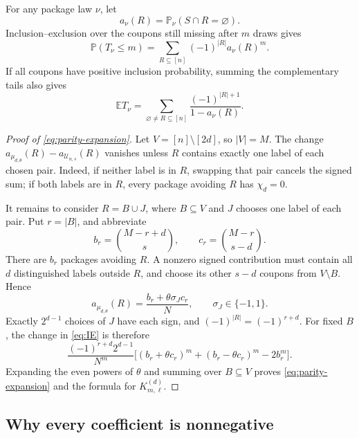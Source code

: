 \documentclass[11pt]{article}
\numberwithin{equation}{section}
\theoremstyle{remark}
\newcommand{\Pp}{\mathbb P}
\newcommand{\E}{\mathbb E}
\newcommand{\1}{\mathbf 1}
\newcommand{\U}{\mathcal U}
\begin{document}
For any package law $\nu$, let
\[
 a_\nu(R)=\Pp_\nu(S\cap R=\varnothing).
\]
Inclusion--exclusion over the coupons still missing after $m$ draws gives
\begin{equation}\label{eq:IE}
 \Pp(T_\nu\leq m)=\sum_{R\subseteq[n]}(-1)^{|R|}a_\nu(R)^m.
\end{equation}
If all coupons have positive inclusion probability, summing the complementary tails also gives
\begin{equation}\label{eq:mean-IE}
 \E T_\nu=\sum_{\varnothing\ne R\subseteq[n]}
       \frac{(-1)^{|R|+1}}{1-a_\nu(R)}.
\end{equation}

\begin{proof}[Proof of \eqref{eq:parity-expansion}]
Let $V=[n]\setminus[2d]$, so $|V|=M$. The change
$a_{\mu_{d,\theta}}(R)-a_{\U_{n,s}}(R)$ vanishes unless $R$ contains exactly one label of each chosen pair. Indeed, if neither label is in $R$, swapping that pair cancels the signed sum; if both labels are in $R$, every package avoiding $R$ has $\chi_d=0$.

It remains to consider $R=B\cup J$, where $B\subseteq V$ and $J$ chooses one label of each pair. Put $r=|B|$, and abbreviate
\[
 b_r=\binom{M-r+d}{s},\qquad c_r=\binom{M-r}{s-d}.
\]
There are $b_r$ packages avoiding $R$. A nonzero signed contribution must contain all $d$ distinguished labels outside $R$, and choose its other $s-d$ coupons from $V\setminus B$. Hence
\[
 a_{\mu_{d,\theta}}(R)=\frac{b_r+\theta\sigma_Jc_r}{N},
 \qquad \sigma_J\in\{-1,1\}.
\]
Exactly $2^{d-1}$ choices of $J$ have each sign, and $(-1)^{|R|}=(-1)^{r+d}$. For fixed $B$, the change in \eqref{eq:IE} is therefore
\[
 \frac{(-1)^{r+d}2^{d-1}}{N^m}
 \bigl[(b_r+\theta c_r)^m+(b_r-\theta c_r)^m-2b_r^m\bigr].
\]
Expanding the even powers of $\theta$ and summing over $B\subseteq V$ proves \eqref{eq:parity-expansion} and the formula for $K^{(d)}_{m,\ell}$.
\end{proof}

\subsection{Why every coefficient is nonnegative}
\end{document}

